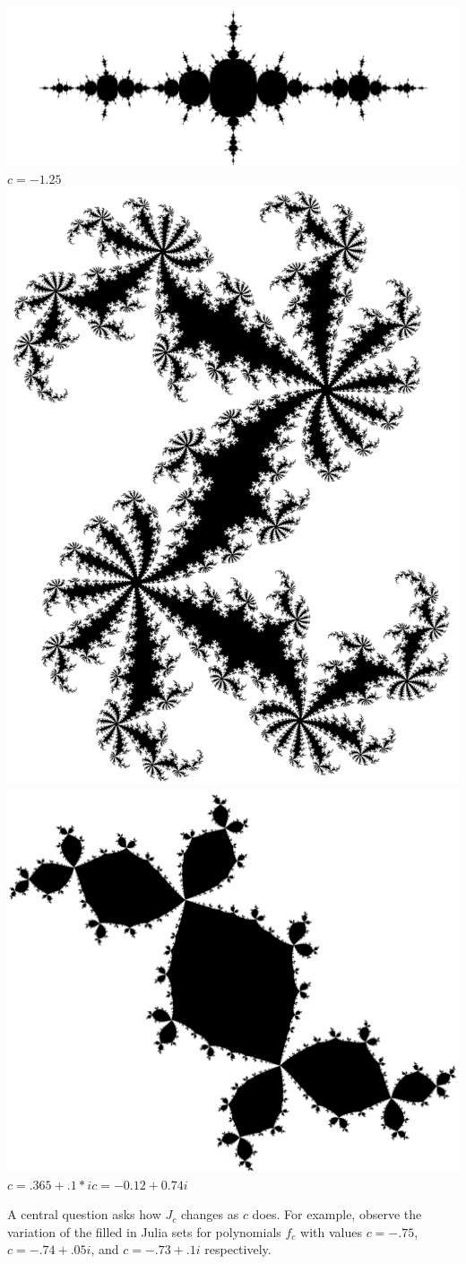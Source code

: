 \documentclass[12 pt]{article}
\begin{document}
\begin{center}
    \includegraphics[width=\textwidth]{images/airplane_cropped.png}
    $c = -1.25$\\
    \includegraphics[width=.3\textwidth]{images/colyish_cropped.png}
    \includegraphics[width=.45\textwidth]{images/rabbit_cropped.png}\\
        $c = .365 + .1*i$\hspace{50pt}$c = -0.12+0.74i$
\end{center}
A central question asks how $J_c$ changes as $c$ does.  For example, observe the variation of the filled in Julia sets for polynomials $f_c$ with values $c=-.75$, $c=-.74+.05i$, and $c=-.73+.1i$ respectively.
\end{document}
